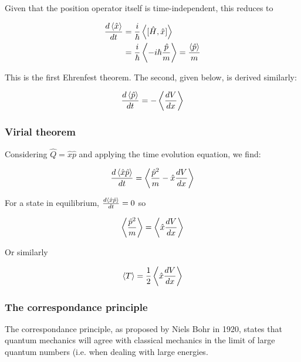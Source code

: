 Given that the position operator itself is time-independent, this reduces to

\begin{align*} 
	\frac{d\expval{\hat{x}}}{dt} &= \frac{i}{\hbar}\expval{[\hat{H}, \hat{x}]} \\
	&= \frac{i}{\hbar}\expval{-i\hbar\frac{\hat{p}}{m}} = \frac{\expval{\hat{p}}}{m}
\end{align*}

This is the first Ehrenfest theorem. The second, given below, is derived similarly:

\[ \frac{d\expval{\hat{p}}}{dt} = -\expval{\frac{dV}{dx}} \]

\subsubsection{Virial theorem}

Considering $\hat{Q} = \hat{x}\hat{p}$ and applying the time evolution equation, we find:

\[ \frac{d\expval{\hat{x}\hat{p}}}{dt} = \expval{\frac{\hat{p}^2}{m} - \hat{x}\frac{dV}{dx}} \]

For a state in equilibrium, $\frac{d\expval{\hat{x}\hat{p}}}{dt} = 0$ so

\[ \expval{\frac{\hat{p}^2}{m}} = \expval{\hat{x}\frac{dV}{dx}} \]

Or similarly

\[ \expval{T} = \frac{1}{2}\expval{\hat{x}\frac{dV}{dx}} \]

\subsubsection{The correspondance principle}

The correspondance principle, as proposed by Niels Bohr in 1920, states that quantum mechanics will agree with classical mechanics in the limit of large quantum numbers (i.e. when dealing with large energies. 